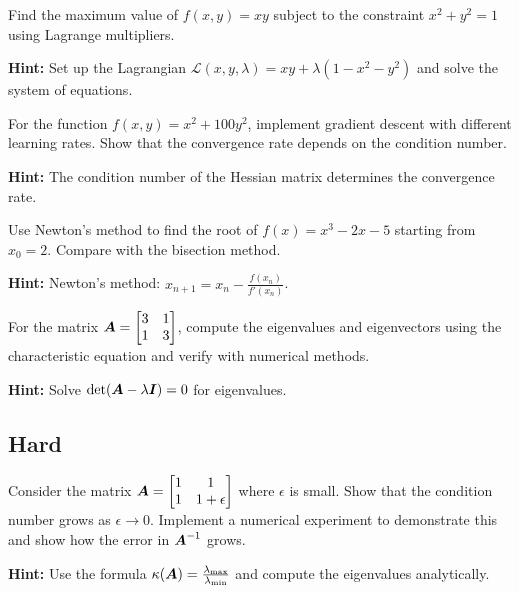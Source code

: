 \begin{problem}
\label{prob:lagrange-multipliers}
Find the maximum value of $f(x, y) = xy$ subject to the constraint $x^2 + y^2 = 1$ using Lagrange multipliers.

\textbf{Hint:} Set up the Lagrangian $\mathcal{L}(x, y, \lambda) = xy + \lambda(1 - x^2 - y^2)$ and solve the system of equations.
\end{problem}

\begin{problem}
\label{prob:gradient-convergence}
For the function $f(x, y) = x^2 + 100y^2$, implement gradient descent with different learning rates. Show that the convergence rate depends on the condition number.

\textbf{Hint:} The condition number of the Hessian matrix determines the convergence rate.
\end{problem}

\begin{problem}
\label{prob:newton-method}
Use Newton's method to find the root of $f(x) = x^3 - 2x - 5$ starting from $x_0 = 2$. Compare with the bisection method.

\textbf{Hint:} Newton's method: $x_{n+1} = x_n - \frac{f(x_n)}{f'(x_n)}$.
\end{problem}

\begin{problem}
\label{prob:eigenvalue-computation}
For the matrix $\boldsymbol{A} = \begin{bmatrix} 3 & 1 \\ 1 & 3 \end{bmatrix}$, compute the eigenvalues and eigenvectors using the characteristic equation and verify with numerical methods.

\textbf{Hint:} Solve $\det(\boldsymbol{A} - \lambda\boldsymbol{I}) = 0$ for eigenvalues.
\end{problem}

\subsection*{Hard}

\begin{problem}
\label{prob:matrix-inversion-stability}
Consider the matrix $\boldsymbol{A} = \begin{bmatrix} 1 & 1 \\ 1 & 1 + \epsilon \end{bmatrix}$ where $\epsilon$ is small. Show that the condition number grows as $\epsilon \to 0$. Implement a numerical experiment to demonstrate this and show how the error in $\boldsymbol{A}^{-1}$ grows.

\textbf{Hint:} Use the formula $\kappa(\boldsymbol{A}) = \frac{\lambda_{\max}}{\lambda_{\min}}$ and compute the eigenvalues analytically.
\end{problem}

